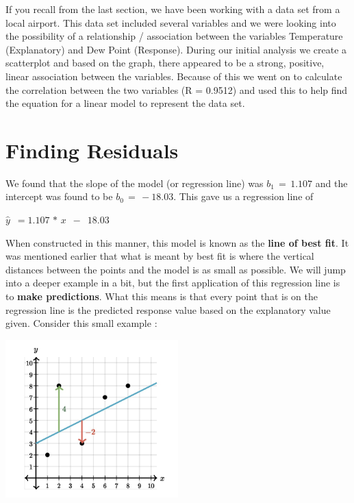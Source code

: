 \documentclass[
  letterpaper,
  DIV=11,
  numbers=noendperiod]{scrreprt}
\begin{document}

If you recall from the last section, we have been working with a data
set from a local airport. This data set included several variables and
we were looking into the possibility of a relationship / association
between the variables Temperature (Explanatory) and Dew Point
(Response). During our initial analysis we create a scatterplot and
based on the graph, there appeared to be a strong, positive, linear
association between the variables. Because of this we went on to
calculate the correlation between the two variables (R = 0.9512) and
used this to help find the equation for a linear model to represent the
data set.

\section*{Finding Residuals}\label{finding-residuals}


We found that the slope of the model (or regression line) was
\(b_1 \,= \,1.107\) and the intercept was found to be
\(b_0\, = \,-18.03\). This gave us a regression line of

\(\displaystyle{\hat{y} \,\,\, = 1.107\,*\, x \,\,\, - \,\,\, 18.03}\)

When constructed in this manner, this model is known as the \textbf{line
of best fit}. It was mentioned earlier that what is meant by best fit is
where the vertical distances between the points and the model is as
small as possible. We will jump into a deeper example in a bit, but the
first application of this regression line is to \textbf{make
predictions}. What this means is that every point that is on the
regression line is the predicted response value based on the explanatory
value given. Consider this small example :

\includegraphics[width=0.5\textwidth,height=\textheight]{./images/ROP_1.jpg}
\end{document}
